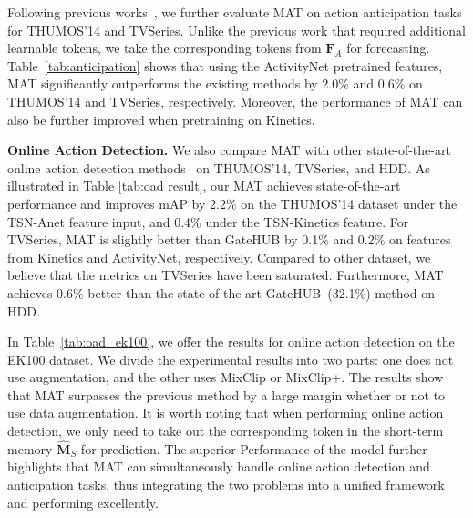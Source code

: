 Following previous works~\cite{lstr, gatehub, testra}, we further evaluate MAT on action anticipation tasks for THUMOS'14 and TVSeries. Unlike the previous work that required additional learnable tokens, we take the corresponding tokens from $ \mathbf{F}_A $ for forecasting. Table~\ref{tab:anticipation} shows that using the ActivityNet pretrained features, MAT significantly outperforms the existing methods by 2.0\% and 0.6\% on THUMOS'14 and TVSeries, respectively.  Moreover, the performance of MAT can also be further improved when pretraining on Kinetics.



\textbf{Online Action Detection.}
We also compare MAT with other state-of-the-art online action detection methods~\cite{trn, lstr, oadtr, colar, gatehub} on THUMOS'14, TVSeries, and HDD. As illustrated in Table \ref{tab:oad result}, our MAT achieves state-of-the-art performance and improves mAP by 2.2\% on the THUMOS'14 dataset under the TSN-Anet feature input, and 0.4\% under the TSN-Kinetics feature. For TVSeries, MAT is slightly better than GateHUB by 0.1\% and 0.2\% on features from Kinetics and ActivityNet, respectively. Compared to other dataset, we believe that the metrics on TVSeries have been saturated.
Furthermore, MAT achieves 0.6\% better than the state-of-the-art GateHUB~(32.1\%) method on HDD. 

In Table~\ref{tab:oad_ek100}, we offer the results for online action detection on the EK100 dataset. We divide the experimental results into
two parts: one does not use augmentation, and the other uses MixClip or MixClip+. The results show that MAT surpasses the previous method by a large margin whether or not to use data augmentation. It is worth noting that when performing online action detection, we only need to take out the corresponding token in the short-term memory $\mathbf{\widehat{M}}_S $ for prediction. The superior Performance of the model further highlights that MAT can simultaneously handle online action detection and anticipation tasks, thus integrating the two problems into a unified framework and performing excellently.

